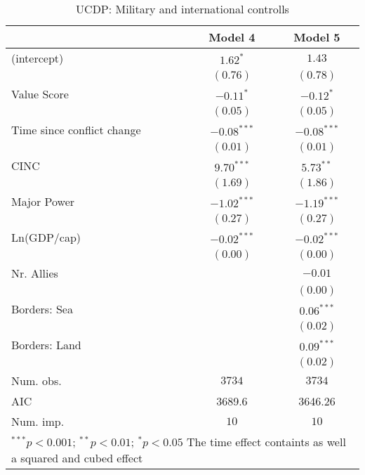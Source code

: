 
\begin{table}
\begin{center}
\begin{tabular}{l c c}
\toprule
 & Model 4 & Model 5 \\
\midrule
(intercept)                & $1.62^{*}$    & $1.43$        \\
                           & $(0.76)$      & $(0.78)$      \\
Value Score                & $-0.11^{*}$   & $-0.12^{*}$   \\
                           & $(0.05)$      & $(0.05)$      \\
Time since conflict change & $-0.08^{***}$ & $-0.08^{***}$ \\
                           & $(0.01)$      & $(0.01)$      \\
CINC                       & $9.70^{***}$  & $5.73^{**}$   \\
                           & $(1.69)$      & $(1.86)$      \\
Major Power                & $-1.02^{***}$ & $-1.19^{***}$ \\
                           & $(0.27)$      & $(0.27)$      \\
Ln(GDP/cap)                & $-0.02^{***}$ & $-0.02^{***}$ \\
                           & $(0.00)$      & $(0.00)$      \\
Nr. Allies                 &               & $-0.01$       \\
                           &               & $(0.00)$      \\
Borders: Sea               &               & $0.06^{***}$  \\
                           &               & $(0.02)$      \\
Borders: Land              &               & $0.09^{***}$  \\
                           &               & $(0.02)$      \\
\midrule
Num. obs.                  & $3734$        & $3734$        \\
AIC                        & 3689.6        & 3646.26       \\
Num. imp.                  & $10$          & $10$          \\
\bottomrule
\multicolumn{3}{l}{\scriptsize{$^{***}p<0.001$; $^{**}p<0.01$; $^{*}p<0.05$ 
 The time effect containts as well a squared and cubed effect}}
\end{tabular}
\caption{UCDP: Military and international controlls}
\label{UCDP_2}
\end{center}
\end{table}
